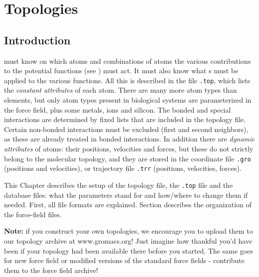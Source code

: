 %
% 
% 
% 
% 
% 
% 
% 
% 
%

\chapter{Topologies}
\label{ch:top}
\section{Introduction}
{\gromacs} must know on which atoms and combinations of atoms the
various contributions to the potential functions (see
) must act. It must
also know what s must be applied to the various
functions. All this is described in the {\em {}} file
{\tt *.top}, which lists the {\em constant attributes} of each atom.
There are many more atom types than elements, but only atom types
present in biological systems are parameterized in the force field,
plus some metals, ions and silicon. The bonded and special
interactions are determined by fixed lists that are included in the
topology file. Certain non-bonded interactions must be excluded (first
and second neighbors), as these are already treated in bonded
interactions.  In addition there are {\em dynamic attributes} of
atoms: their positions, velocities and forces, but these do not
strictly belong to the molecular topology, and they are stored in the
coordinate file {\tt *.gro} (positions and velocities), or trajectory
file {\tt *.trr} (positions, velocities, forces).

This Chapter describes the setup of the topology file, the
{\tt *.top} file and the database files: what the parameters
stand for and how/where to change them if needed.
First, all file formats are explained.
Section  describes the organization of
the force-field files.

{\bf Note:} if you construct your own topologies, we encourage you
to upload them to our topology archive at www.gromacs.org! Just imagine
how thankful you'd have been if your topology had been available
there before you started. The same goes for new force field or
modified versions of the standard force fields - contribute them
to the force field archive!

